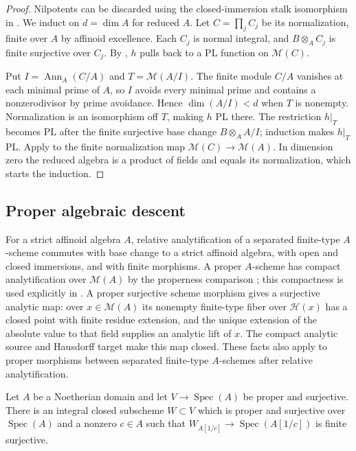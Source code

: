 \begin{proof}
Nilpotents can be discarded using the closed-immersion stalk isomorphism in . We induct on $d=\dim A$ for reduced $A$. Let $C=\prod_j C_j$ be its normalization, finite over $A$ by affinoid excellence. Each $C_j$ is normal integral, and $B\otimes_A C_j$ is finite surjective over $C_j$. By , $h$ pulls back to a PL function on $\mathcal M(C)$.

Put $I=\operatorname{Ann}_A(C/A)$ and $T=\mathcal M(A/I)$. The finite module $C/A$ vanishes at each minimal prime of $A$, so $I$ avoids every minimal prime and contains a nonzerodivisor by prime avoidance. Hence $\dim(A/I)<d$ when $T$ is nonempty. Normalization is an isomorphism off $T$, making $h$ PL there. The restriction $h|_T$ becomes PL after the finite surjective base change $B\otimes_A A/I$; induction makes $h|_T$ PL. Apply  to the finite normalization map $\mathcal M(C)\to\mathcal M(A)$. In dimension zero the reduced algebra is a product of fields and equals its normalization, which starts the induction.
\end{proof}

\subsection{Proper algebraic descent}\label{sec:supplied-p061-proper-descent}

For a strict affinoid algebra $A$, relative analytification of a separated finite-type $A$-scheme commutes with base change to a strict affinoid algebra, with open and closed immersions, and with finite morphisms. A proper $A$-scheme has compact analytification over $\mathcal M(A)$ by the properness comparison \cite[Proposition~2.6.9]{Berk93}; this compactness is used explicitly in \cite[proof of Theorem~1.3.1]{Berkovich15Finiteness}. A proper surjective scheme morphism gives a surjective analytic map: over $x\in\mathcal M(A)$ its nonempty finite-type fiber over $\mathscr H(x)$ has a closed point with finite residue extension, and the unique extension of the absolute value to that field supplies an analytic lift of $x$. The compact analytic source and Hausdorff target make this map closed. These facts also apply to proper morphisms between separated finite-type $A$-schemes after relative analytification.

\begin{lemma}\label{lem:supplied-p061-generic-multisection}
Let $A$ be a Noetherian domain and let $V\to\operatorname{Spec}(A)$ be proper and surjective. There is an integral closed subscheme $W\subset V$ which is proper and surjective over $\operatorname{Spec}(A)$ and a nonzero $c\in A$ such that $W_{A[1/c]}\to\operatorname{Spec}(A[1/c])$ is finite surjective.
\end{lemma}

